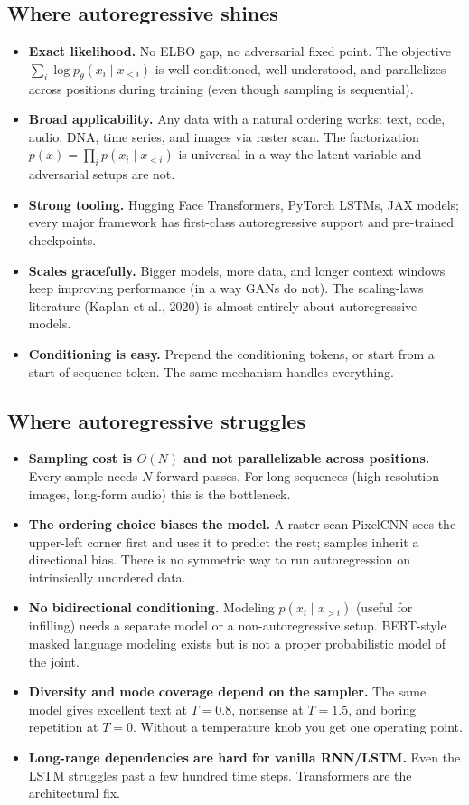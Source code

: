 \documentclass[11pt]{article}
\theoremstyle{remark}
\begin{document}
\subsection{Where autoregressive shines}
\begin{itemize}
\item \textbf{Exact likelihood.} No ELBO gap, no adversarial fixed point. The objective $\sum_i \log p_\theta(x_i \mid x_{<i})$ is well-conditioned, well-understood, and parallelizes across positions during training (even though sampling is sequential).
\item \textbf{Broad applicability.} Any data with a natural ordering works: text, code, audio, DNA, time series, and images via raster scan. The factorization $p(x) = \prod_i p(x_i \mid x_{<i})$ is universal in a way the latent-variable and adversarial setups are not.
\item \textbf{Strong tooling.} Hugging Face Transformers, PyTorch LSTMs, JAX models; every major framework has first-class autoregressive support and pre-trained checkpoints.
\item \textbf{Scales gracefully.} Bigger models, more data, and longer context windows keep improving performance (in a way GANs do not). The scaling-laws literature (Kaplan et al., 2020) is almost entirely about autoregressive models.
\item \textbf{Conditioning is easy.} Prepend the conditioning tokens, or start from a start-of-sequence token. The same mechanism handles everything.
\end{itemize}

\subsection{Where autoregressive struggles}
\begin{itemize}
\item \textbf{Sampling cost is $O(N)$ and not parallelizable across positions.} Every sample needs $N$ forward passes. For long sequences (high-resolution images, long-form audio) this is the bottleneck.
\item \textbf{The ordering choice biases the model.} A raster-scan PixelCNN sees the upper-left corner first and uses it to predict the rest; samples inherit a directional bias. There is no symmetric way to run autoregression on intrinsically unordered data.
\item \textbf{No bidirectional conditioning.} Modeling $p(x_i \mid x_{>i})$ (useful for infilling) needs a separate model or a non-autoregressive setup. BERT-style masked language modeling exists but is not a proper probabilistic model of the joint.
\item \textbf{Diversity and mode coverage depend on the sampler.} The same model gives excellent text at $T = 0.8$, nonsense at $T = 1.5$, and boring repetition at $T = 0$. Without a temperature knob you get one operating point.
\item \textbf{Long-range dependencies are hard for vanilla RNN/LSTM.} Even the LSTM struggles past a few hundred time steps. Transformers are the architectural fix.
\end{itemize}
\end{document}
